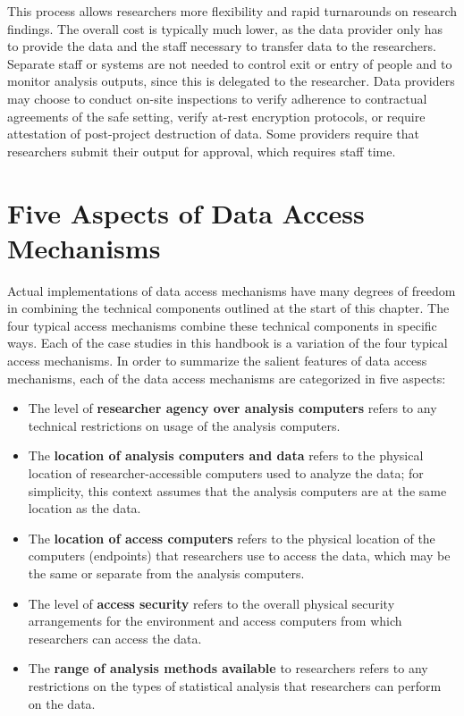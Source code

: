 This process allows researchers more flexibility and rapid turnarounds on research findings. The overall cost is typically much lower, as the data provider only has to provide the data and the staff necessary to transfer data to the researchers. Separate staff or systems are not needed to control exit or entry of people and to monitor analysis outputs, since this is delegated to the researcher. Data providers may choose to conduct on-site inspections to verify adherence to contractual agreements of the safe setting, verify at-rest encryption protocols, or require attestation of post-project destruction of data. Some providers require that researchers submit their output for approval, which requires staff time.

\hypertarget{five-aspects-of-data-access-mechanisms}{%
\section{Five Aspects of Data Access Mechanisms}\label{five-aspects-of-data-access-mechanisms}}

Actual implementations of data access mechanisms have many degrees of freedom in combining the technical components outlined at the start of this chapter. The four typical access mechanisms combine these technical components in specific ways. Each of the case studies in this handbook is a variation of the four typical access mechanisms. In order to summarize the salient features of data access mechanisms, each of the data access mechanisms are categorized in five aspects:

\begin{itemize}
\tightlist
\item
  The level of \textbf{researcher agency over analysis computers} refers to any technical restrictions on usage of the analysis computers.
\item
  The \textbf{location of analysis computers and data} refers to the physical location of researcher-accessible computers used to analyze the data; for simplicity, this context assumes that the analysis computers are at the same location as the data.
\item
  The \textbf{location of access computers} refers to the physical location of the computers (endpoints) that researchers use to access the data, which may be the same or separate from the analysis computers.
\item
  The level of \textbf{access security} refers to the overall physical security arrangements for the environment and access computers from which researchers can access the data.
\item
  The \textbf{range of analysis methods available} to researchers refers to any restrictions on the types of statistical analysis that researchers can perform on the data.
\end{itemize}

